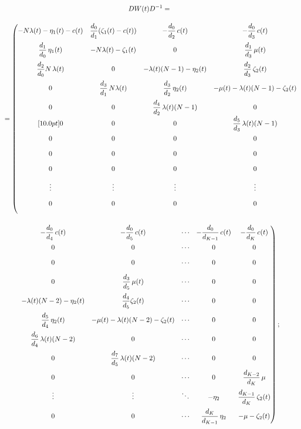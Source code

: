 \noindent
{ %
\begin{multline*}
            DW(t)D^{-1} ={}\\[10.0pt]
            {}=\left(
            \begin{matrix}
                -N\lambda(t) - \eta_1(t)-c(t)   & \fr{d_0}{d_1}(\zeta_1(t)-c(t))           &  -\fr{d_0}{d_2}\,c(t) & -\fr{d_0}{d_3}\,c(t)\\[10.0pt]
\fr{d_1}{d_0}\,\eta_1(t)               & -N\lambda(t)-\zeta_1(t) &  0                    & \fr{d_1}{d_3}\,\mu(t)\\[10.0pt]
 \fr{d_2}{d_0}N\,\lambda(t)             & 0                 &  -\lambda(t)(N-1)-\eta_2(t) & \fr{d_2}{d_3}\,\zeta_2(t)\\[10.0pt]
0   & \fr{d_3}{d_1}\,N\lambda(t)  &\fr{d_3}{d_2}\,\eta_2(t)  & -\mu(t)-\lambda(t)(N-1)-\zeta_2(t)\\[10.0pt]
0   & 0    &  \fr{d_4}{d_2}\,\lambda(t)(N-1)  & 0\\ [10.0pt]
0   & 0    &  0  & \fr{d_5}{d_3}\,\lambda(t)(N-1)\\[10.0pt]
0   & 0    &  0  & 0\\[10.0pt]
0   & 0    &  0  & 0\\[10.0pt]
0   & 0    &  0  & 0\\[10.0pt]
\vdots     & \vdots            &  \vdots  &  \vdots \\[10.0pt]
0   & 0    & 0   &0\\[10.0pt]
            \end{matrix}\right.\\[10.0pt]
\left.                        \begin{matrix}
             -\fr{d_0}{d_4}\,c(t)&-\fr{d_0}{d_5}\,c(t)&\cdots  & -\fr{d_0}{d_{K-1}}\,c(t)& -\fr{d_0}{d_{K}}\,c(t)  \\[10.0pt]
              0&0&\cdots  & 0& 0  \\[10.0pt]
               0&0&\cdots  & 0& 0  \\[10.0pt]
                0&\fr{d_3}{d_5}\,\mu(t)&\cdots  & 0& 0  \\[10.0pt]
                 -\lambda(t)(N-2)-\eta_2(t)&\fr{d_4}{d_5}\zeta_2(t)&\cdots  & 0& 0  \\[10.0pt]
                  \fr{d_5}{d_4}\,\eta_2(t)&-\mu(t)-\lambda(t)(N-2)-\zeta_2(t)&\cdots  & 0& 0  \\[10.0pt]
                   \fr{d_6}{d_4}\,\lambda(t)(N-2)&0&\cdots  & 0& 0  \\[10.0pt]
                    0&\fr{d_7}{d_5}\,\lambda(t)(N-2)&\cdots  & 0& 0  \\[10.0pt]
                     0&0&\cdots  & 0& \fr{d_{K-2}}{d_K}\,\mu  \\[10.0pt]
                      \vdots &\vdots & \ddots  & -\eta_2& \fr{d_{K-1}}{d_K}\,\zeta_2(t)  \\[10.0pt]
                      0&  0  & \cdots  & \fr{d_{K}}{d_{K-1}}\,\eta_2& -\mu-\zeta_2(t)  
                      \end{matrix}\right);
                 \end{multline*}
    }
    
